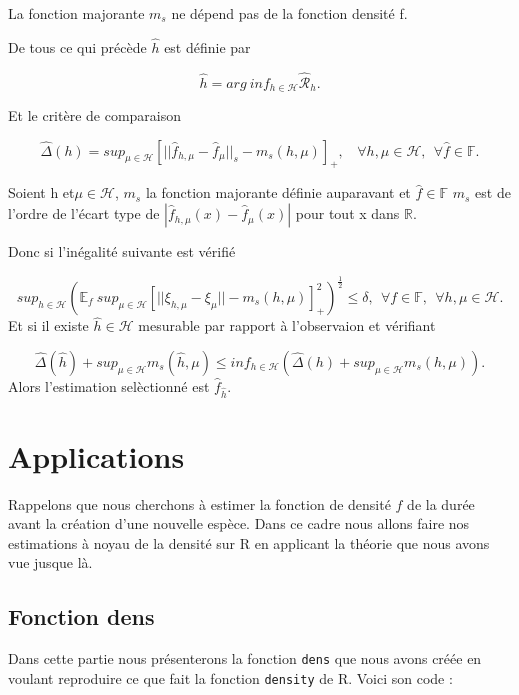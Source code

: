 \documentclass[
]{book}
\theoremstyle{definition}
\theoremstyle{definition}
\theoremstyle{definition}
\theoremstyle{definition}
\theoremstyle{remark}
\begin{document}
\begin{rem}
La fonction majorante $m_s$ ne dépend pas de la fonction densité f.
\end{rem}

De tous ce qui précède \(\hat h\) est définie par\newline

\[
\hat h = arg~inf_{h \in \mathcal{H}} \mathcal{\hat R}_h.
\]

Et le critère de comparaison

\[
\hat{\Delta}(h)= sup_{\mu \in \mathcal{H}}[||\hat f_{h,\mu}-\hat f_\mu||_s - m_s(h,\mu)]_+,~~~~\forall h,\mu \in \mathcal H,~~\forall \hat f \in \mathbb F.
\]

\begin{rem}
Soient h et$\mu \in \mathcal H$, $m_s$ la fonction majorante définie auparavant et $\hat f \in \mathbb F$
$m_s$ est de l'ordre de l'écart type de $|\hat f_{h,\mu}(x)-\hat f_\mu(x)|$ pour tout x dans $\mathbb R$.
\end{rem}

Donc si l'inégalité suivante est vérifié

\[
sup_{h \in \mathcal{H}}(\mathbb{E}_f~sup_{\mu \in \mathcal H}[||\xi_{h,\mu}-\xi_\mu || - m_s(h,\mu)]_+^2)^{\frac{1}{2}} \leq \delta,~~\forall f \in \mathbb{F}, ~~\forall h,\mu \in \mathcal H.
\]
Et si il existe \(\hat h \in \mathcal{H}\) mesurable par rapport à l'observaion et vérifiant

\[
\hat{\Delta}(\hat h)+sup_{\mu \in \mathcal H}m_s(\hat h, \mu) \leq inf_{h \in \mathcal H}(\hat \Delta(h) +sup_{\mu \in \mathcal H}m_s(h,\mu)).
\]
Alors l'estimation selèctionné est \(\hat f_{\hat h}\).

\hypertarget{applications}{%
\chapter{Applications}\label{applications}}

Rappelons que nous cherchons à estimer la fonction de densité \(f\) de la durée avant la création d'une nouvelle espèce. Dans ce cadre nous allons faire nos estimations à noyau de la densité sur R en applicant la théorie que nous avons vue jusque là.

\hypertarget{fonction-dens}{%
\section{Fonction dens}\label{fonction-dens}}

Dans cette partie nous présenterons la fonction \texttt{dens} que nous avons créée en voulant reproduire ce que fait la fonction \texttt{density} de R.
Voici son code :
\end{document}

